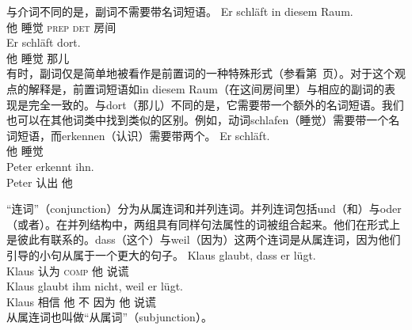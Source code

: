 与介词不同的是，副词不需要带名词短语。
\eal
\ex
\gll Er schläft in diesem Raum.\\
	 他 睡觉 \textsc{prep} \textsc{det} 房间\\
\ex
\gll Er schläft dort.\\
	 他 睡觉 那儿\\
\zl
有时，副词仅是简单地被看作是前置词的一种特殊形式（参看第~\pageref{Seite-Adverbien-PP}页）。对于这个观点的解释是，前置词短语如in diesem Raum（在这间房间里）与相应的副词的表现是完全一致的。与dort（那儿）不同的是，它需要带一个额外的名词短语。我们也可以在其他词类中找到类似的区别。例如，动词schlafen（睡觉）需要带一个名词短语，而erkennen（认识）需要带两个。
\eal
\ex 
\gll Er schläft.\\
     他 睡觉\\
\ex 
\gll Peter erkennt ihn.\\
     Peter 认出 他\\
\zl

“连词”（conjunction）分为从属连词和并列连词。并列连词包括und（和）与oder（或者）。在并列结构中，两组具有同样句法属性的词被组合起来。他们在形式上是彼此有联系的。dass（这个）与weil（因为）这两个连词是从属连词，因为他们引导的小句从属于一个更大的句子。
\eal
\ex 
\gll Klaus glaubt, dass er lügt.\\
	 Klaus 认为 \textsc{comp} 他 说谎\\
\ex 
\gll Klaus glaubt ihm nicht, weil er lügt.\\
	 Klaus 相信 他 不 因为 他 说谎\\
\zl
从属连词也叫做“从属词”（subjunction）。

